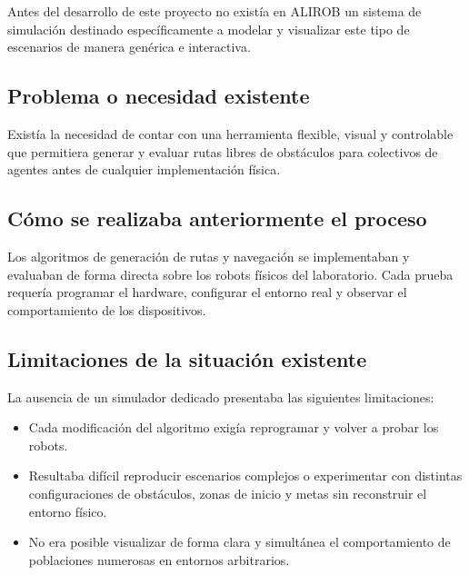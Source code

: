\documentclass[12pt,a4paper]{article}
\begin{document}
Antes del desarrollo de este proyecto no existía en ALIROB un sistema de simulación destinado específicamente a modelar y visualizar este tipo de escenarios de manera genérica e interactiva.

\subsection*{Problema o necesidad existente}
Existía la necesidad de contar con una herramienta flexible, visual y controlable que permitiera generar y evaluar rutas libres de obstáculos para colectivos de agentes antes de cualquier implementación física.

\subsection*{Cómo se realizaba anteriormente el proceso}
Los algoritmos de generación de rutas y navegación se implementaban y evaluaban de forma directa sobre los robots físicos del laboratorio. Cada prueba requería programar el hardware, configurar el entorno real y observar el comportamiento de los dispositivos.

\subsection*{Limitaciones de la situación existente}
La ausencia de un simulador dedicado presentaba las siguientes limitaciones:
\begin{itemize}
    \item Cada modificación del algoritmo exigía reprogramar y volver a probar los robots.
    \item Resultaba difícil reproducir escenarios complejos o experimentar con distintas configuraciones de obstáculos, zonas de inicio y metas sin reconstruir el entorno físico.
    \item No era posible visualizar de forma clara y simultánea el comportamiento de poblaciones numerosas en entornos arbitrarios.
\end{itemize}
\end{document}
